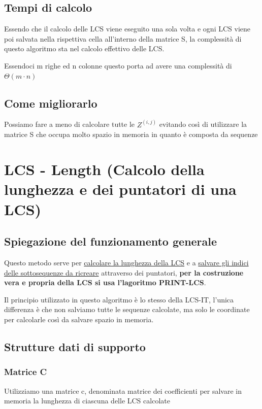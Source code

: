 \subsection{Tempi di calcolo}
Essendo che il calcolo delle LCS viene eseguito una sola volta e ogni LCS viene poi salvata nella rispettiva cella all'interno della matrice S, la complessità di questo algoritmo sta nel calcolo effettivo delle LCS.

Essendoci m righe ed n colonne questo porta ad avere una complessità di $\Theta(m \cdot n)$

\subsection{Come migliorarlo}
Possiamo fare a meno di calcolare tutte le $Z^{(i,j)}$ evitando così di utilizzare la matrice S che occupa molto spazio in memoria in quanto è composta da sequenze


\newpage
\section{LCS - Length (Calcolo della lunghezza e dei puntatori di una LCS)}

\subsection{Spiegazione del funzionamento generale}
Questo metodo serve per \uline{calcolare la lunghezza della LCS} e a \uline{salvare gli indici delle sottosequenze da ricreare} attraverso dei puntatori, \textbf{per la costruzione vera e propria della LCS si usa l'lagoritmo PRINT-LCS}.


Il principio utilizzato in questo algoritmo è lo stesso della LCS-IT, l'unica differenza è che non salviamo tutte le sequenze calcolate, ma solo le coordinate per calcolarle così da salvare spazio in memoria.


\subsection{Strutture dati di supporto}

\subsubsection{Matrice C}
Utilizziamo una matrice c, denominata matrice dei coefficienti per salvare in memoria la lunghezza di ciascuna delle LCS calcolate


